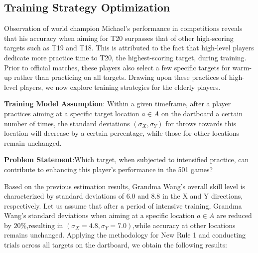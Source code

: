 \documentclass[cjjs]{ipart}
\theoremstyle{plain}
\begin{document}
\subsection{Training Strategy Optimization}
Observation of world champion Michael's performance in competitions reveals that his accuracy when aiming for T20 surpasses that of other high-scoring targets such as T19 and T18. This is attributed to the fact that high-level players dedicate more practice time to T20, the highest-scoring target, during training. Prior to official matches, these players also select a few specific targets for warm-up rather than practicing on all targets. Drawing upon these practices of high-level players, we now explore training strategies for the elderly players.

\textbf{Training Model Assumption}: Within a given timeframe, after a player practices aiming at a specific target location $a \in A$ on the dartboard a certain number of times, the standard deviations $(\sigma_X, \sigma_Y)$ for throws towards this location will decrease by a certain percentage, while those for other locations remain unchanged.

\textbf{Problem Statement}:Which target, when subjected to intensified practice, can contribute to enhancing this player's performance in the 501 games?

Based on the previous estimation results, Grandma Wang's overall skill level is characterized by standard deviations of 6.0 and 8.8 in the X and Y directions, respectively. Let us assume that after a period of intensive training, Grandma Wang's standard deviations when aiming at a specific location $a \in A$ are reduced by $20\%$,resulting in $(\sigma_X = 4.8, \sigma_Y = 7.0)$,while accuracy at other locations remains unchanged. Applying the methodology for New Rule 1 and conducting trials across all targets on the dartboard, we obtain the following results:
\end{document}
